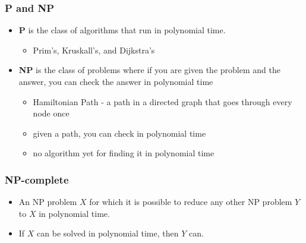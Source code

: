 \documentclass{beamer}
\begin{document}
\begin{frame}
\frametitle{P and NP}
\begin{itemize}
\item \textbf{P} is the class of algorithms that run in polynomial time.
    \begin{itemize}
    \item Prim's, Kruskall's, and Dijkstra's
    \end{itemize}
\item \textbf{NP} is the class of problems where if you are given the problem and the answer, you can check the answer in polynomial time
    \begin{itemize}
    \item Hamiltonian Path - a path in a directed graph that goes through every node once
    \item given a path, you can check in polynomial time
    \item no algorithm yet for finding it in polynomial time
    \end{itemize}
\end{itemize}

\end{frame}
\begin{frame}
\frametitle{NP-complete}
\begin{itemize}
\item An NP problem $X$ for which it is possible to reduce any other NP problem $Y$ to $X$ in polynomial time.
\item If $X$ can be solved in polynomial time, then $Y$ can.

\end{itemize}

\end{frame}
\end{document}

